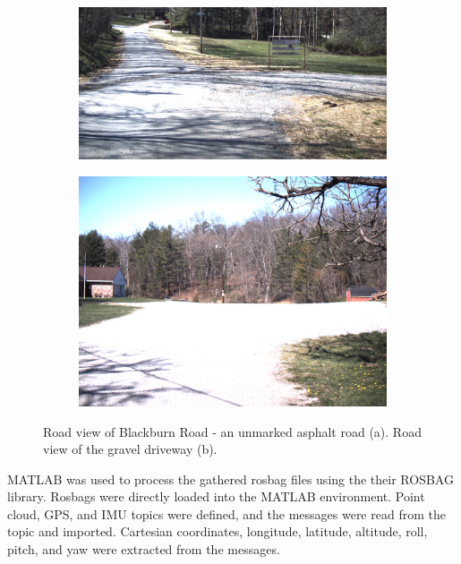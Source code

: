 \documentclass[journal,onecolumn]{IEEEtran}
\begin{document}
	\begin{figure}[H]
		\centering
		\begin{subfigure}{0.45\textwidth}
			\centering
			\includegraphics[width=1.0\linewidth,height=5.0 cm,keepaspectratio]{figures/vlcsnap-2023-04-20-08h48m17s447}
			\caption[Blackburn Road Camera View]{}
			\label{fig:Blackburn_Road_View}
		\end{subfigure}
		\begin{subfigure}{0.45\textwidth}
			\centering
			\includegraphics[width=1.0\linewidth,height=5.0 cm,keepaspectratio]{figures/gravel_lot_pic.png}
			\caption[Armig Road Camera View]{}
			\label{fig:Gravel_Lot_View}
		\end{subfigure}
		\caption[Blackburn Road \& Gravel Parking Lot]{Road view of Blackburn Road - an unmarked asphalt road (a). Road view of the gravel driveway (b).}
		\label{fig:Combined_Roads}
	\end{figure}

	{MATLAB was used to process the gathered rosbag files using the their ROSBAG library. Rosbags were directly loaded into the MATLAB environment. Point cloud, GPS, and IMU topics were defined, and the messages were read from the topic and imported. Cartesian coordinates, longitude, latitude, altitude, roll, pitch, and yaw were extracted from the messages.}
	
\end{document}
